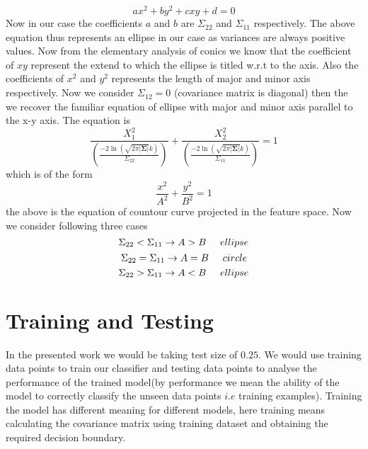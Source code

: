 \documentclass[a4paper]{article}
\begin{document}
\begin{equation}
ax^{2}+by^{2}+cxy+d=0
\end{equation}Now in our case the coefficients $a$ and $b$ are $\Sigma_{22}$ and $\Sigma_{11}$ respectively. The above equation thus represents an ellipse in our case as variances are always positive values. Now from the elementary analysis of conics we know that the coefficient of $xy$ represent the extend to which the ellipse is titled w.r.t to the axis. Also the coefficients of $x^{2}$ and $y^{2}$ represents the length of major and minor axis respectively. Now we consider $\Sigma_{12}=0$ (covariance matrix is diagonal) then the we recover the familiar equation of ellipse with major and minor axis parallel to the x-y axis. The equation is
\begin{equation}
\frac{X_{1}^{2}}{\left(\frac{-2\ln(\sqrt{2\pi\left|\mathbf{\Sigma}\right|}k)}{\Sigma_{22}}\right)}+\frac{X_{2}^{2}}{\left(\frac{-2\ln(\sqrt{2\pi\left|\mathbf{\Sigma}\right|}k)}{\Sigma_{11}}\right)}=1
\end{equation}which is of the form
\[
\frac{x^{2}}{A^{2}}+\frac{y^{2}}{B^{2}}=1
\]the above is the equation of countour curve projected in the feature space. Now we consider following three cases
\[
\Sigma_{22} < \Sigma_{11}\rightarrow A > B \hspace{0.5cm} ellipse
\]
\[
\Sigma_{22} = \Sigma_{11}\rightarrow A=B \hspace{0.5cm} circle
\]
\[
\Sigma_{22} > \Sigma_{11}\rightarrow A < B \hspace{0.5cm} ellipse
 \] 
\section{Training and Testing}
In the presented work we would be taking test size of $0.25$. We would use training data points to train our classifier and testing data points to analyse the performance of the trained model(by performance we mean the ability of the model to correctly classify the unseen data points $i.e$ training examples). Training the model has different meaning for different models, here training means calculating the covariance matrix using training dataset and obtaining the required decision boundary.
\end{document}
